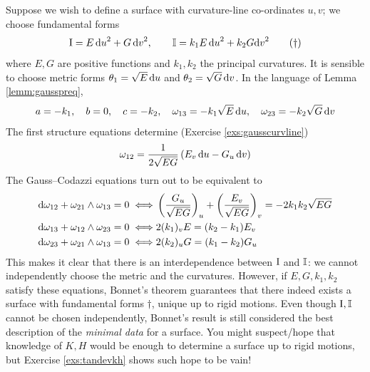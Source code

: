  
 Suppose we wish to define a surface with curvature-line co-ordinates $u,v$; we choose fundamental forms
\[\mathrm{I}=E\,{\mathrm{d} u}^2+G\,{\mathrm{d} v}^2,\qquad \mathbb{I}=k_1E\,{\mathrm{d} u}^2+k_2 G{\mathrm{d} v}^2\tag{$\dag$}\]
where $E,G$ are positive functions and $k_1,k_2$ the principal curvatures. It is sensible to choose metric forms $\theta_1=\sqrt E\,{\mathrm{d} u}$ and $\theta_2=\sqrt G\,{\mathrm{d} v}$. In the language of Lemma \ref{lemm:gausspreq},
\[a=-k_1,\quad b=0,\quad c=-k_2,\quad \omega_{13}=-k_1\sqrt E\,{\mathrm{d} u},\quad\omega_{23}=-k_2\sqrt G\,{\mathrm{d} v}\]
The first structure equations determine (Exercise \ref{exs:gausscurvline})
\[\omega_{12}= \frac 1{2\sqrt{EG}}\left(E_v\,{\mathrm{d} u} -G_u\,{\mathrm{d} v}\right)\]
The Gauss--Codazzi equations turn out to be equivalent to
\begin{align*}
\mathrm{d}\omega_{12}+\omega_{21}\wedge\omega_{13}=0\iff &\left(\frac{G_u}{\sqrt{EG}}\right)_u+\left(\frac{E_v}{\sqrt{EG}}\right)_v =-2k_1k_2\sqrt{EG}\\
\mathrm{d}\omega_{13}+\omega_{12}\wedge\omega_{23}=0\iff &2(k_1)_vE=(k_2-k_1)E_v\\
\mathrm{d}\omega_{23}+\omega_{21}\wedge\omega_{13}=0\iff &2(k_2)_uG=(k_1-k_2)G_u
\end{align*}
This makes it clear that there is an interdependence between $\mathrm{I}$ and $\mathbb{I}$: we cannot independently choose the metric and the curvatures. However, if $E,G,k_1,k_2$ satisfy these equations, Bonnet's theorem guarantees that there indeed exists a surface with fundamental forms $\dag$, unique up to rigid motions.\smallbreak
Even though $\mathrm{I},\mathbb{I}$ cannot be chosen independently, Bonnet's result is still considered the best description of the \emph{minimal data} for a surface. You might suspect/hope that knowledge of $K,H$ would be enough to determine a surface up to rigid motions, but Exercise \ref{exs:tandevkh} shows such hope to be vain!

\goodbreak


